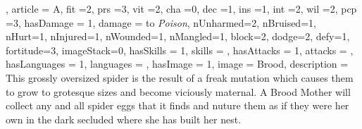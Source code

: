 {{, article = A, fit =2, prs =3, vit =2, cha =0, dec =1, ins =1, int =2, wil =2, pcp =3, hasDamage = 1, damage = to \textit{Poison}, nUnharmed=2, nBruised=1, nHurt=1, nInjured=1, nWounded=1, nMangled=1, block=2, dodge=2, defy=1, fortitude=3, imageStack=0, hasSkills = 1, skills =  
, hasAttacks = 1, attacks = 
, hasLanguages = 1, languages = , hasImage = 1, image = Brood, description = This grossly oversized spider is the result of a freak mutation which  causes them to grow to grotesque sizes and become viciously maternal. A Brood Mother will collect any and all spider eggs that it finds and nuture them as if they were her own in the dark\comma{} secluded where she has built her nest.}



}




